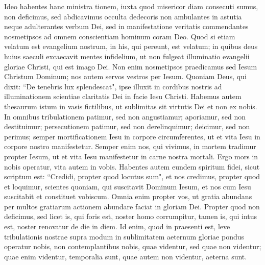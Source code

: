 \begin{biblechapter}  
\verse Ideo habentes hanc ministra tionem, iuxta quod misericor diam consecuti sumus, non deficimus, 
\verse sed abdicavimus occulta dedecoris non ambulantes in astutia neque adulterantes verbum Dei, sed in manifestatione veritatis commendantes nosmetipsos ad omnem conscientiam hominum coram Deo. 
\verse Quod si etiam velatum est evangelium nostrum, in his, qui pereunt, est velatum; 
\verse in quibus deus huius saeculi excaecavit mentes infidelium, ut non fulgeat illuminatio evangelii gloriae Christi, qui est imago Dei. 
\verse Non enim nosmetipsos praedicamus sed Iesum Christum Dominum; nos autem servos vestros per Iesum. 
\verse Quoniam Deus, qui dixit: “De tenebris lux splendescat", ipse illuxit in cordibus nostris ad illuminationem scientiae claritatis Dei in facie Iesu Christi. 
\verse Habemus autem thesaurum istum in vasis fictilibus, ut sublimitas sit virtutis Dei et non ex nobis. 
\verse In omnibus tribulationem patimur, sed non angustiamur; aporiamur, sed non destituimur; 
\verse persecutionem patimur, sed non derelinquimur; deicimur, sed non perimus; 
\verse semper mortificationem Iesu in corpore circumferentes, ut et vita Iesu in corpore nostro manifestetur.  
\verse Semper enim nos, qui vivimus, in mortem tradimur propter Iesum, ut et vita Iesu manifestetur in carne nostra mortali. 
\verse Ergo mors in nobis operatur, vita autem in vobis. 
\verse Habentes autem eundem spiritum fidei, sicut scriptum est: “Credidi, propter quod locutus sum", et nos credimus, propter quod et loquimur, 
\verse scientes quoniam, qui suscitavit Dominum Iesum, et nos cum Iesu suscitabit et constituet vobiscum. 
\verse Omnia enim propter vos, ut gratia abundans per multos gratiarum actionem abundare faciat in gloriam Dei. 
\verse Propter quod non deficimus, sed licet is, qui foris est, noster homo corrumpitur, tamen is, qui intus est, noster renovatur de die in diem. 
\verse Id enim, quod in praesenti est, leve tribulationis nostrae supra modum in sublimitatem aeternum gloriae pondus operatur nobis, 
\verse non contemplantibus nobis, quae videntur, sed quae non videntur; quae enim videntur, temporalia sunt, quae autem non videntur, aeterna sunt. 
\end{biblechapter}

